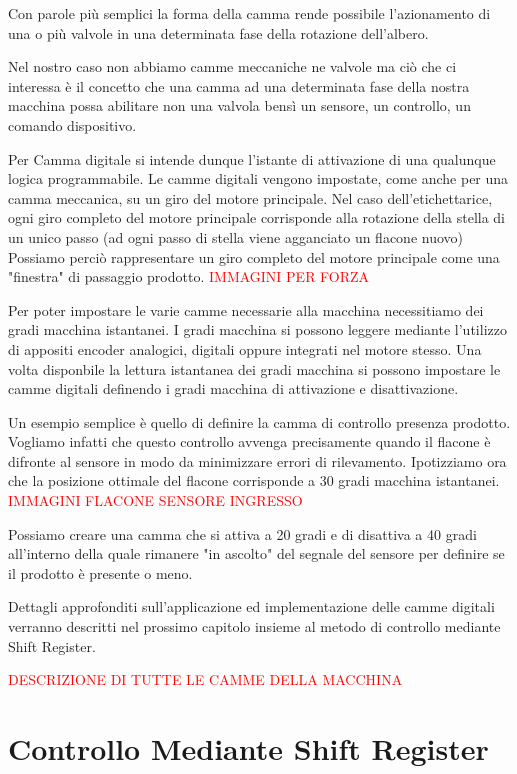 \documentclass[12pt, a4paper, oneside]{book}
\begin{document}
Con parole più semplici la forma della camma rende possibile l'azionamento di una o più valvole in una determinata fase della rotazione dell'albero. 

Nel nostro caso non abbiamo camme meccaniche ne valvole ma ciò che ci interessa è il concetto che una camma ad una determinata fase della nostra macchina possa abilitare non una valvola bensì un sensore, un controllo, un comando dispositivo.

Per Camma digitale si intende dunque l'istante di attivazione di una qualunque logica programmabile. Le camme digitali vengono impostate, come anche per una camma meccanica, su un giro del motore principale.
Nel caso dell'etichettarice, ogni giro completo del motore principale corrisponde alla rotazione della stella di un unico passo (ad ogni passo di stella viene agganciato un flacone nuovo)
Possiamo perciò rappresentare un giro completo del motore principale come una "finestra" di passaggio prodotto. \textcolor{red}{IMMAGINI PER FORZA}

Per poter impostare le varie camme necessarie alla macchina necessitiamo dei gradi macchina istantanei. I gradi macchina si possono leggere mediante l'utilizzo di appositi encoder analogici, digitali oppure integrati nel motore stesso.
Una volta disponbile la lettura istantanea dei gradi macchina si possono impostare le camme digitali definendo i gradi macchina di attivazione e disattivazione. 

Un esempio semplice è quello di definire la camma di controllo presenza prodotto. Vogliamo infatti che questo controllo avvenga precisamente quando il flacone è difronte al sensore in modo da minimizzare errori di rilevamento.
Ipotizziamo ora che la posizione ottimale del flacone corrisponde a 30 gradi macchina istantanei. 
\textcolor{red}{IMMAGINI FLACONE SENSORE INGRESSO}

Possiamo creare una camma che si attiva a 20 gradi e di disattiva a 40 gradi all'interno della quale rimanere "in ascolto" del segnale del sensore per definire se il prodotto è presente o meno.

Dettagli approfonditi sull'applicazione ed implementazione delle camme digitali verranno descritti nel prossimo capitolo insieme al metodo di controllo mediante Shift Register. 

\textcolor{red}{DESCRIZIONE DI TUTTE LE CAMME DELLA MACCHINA}






\section{Controllo Mediante Shift Register}
\end{document}
